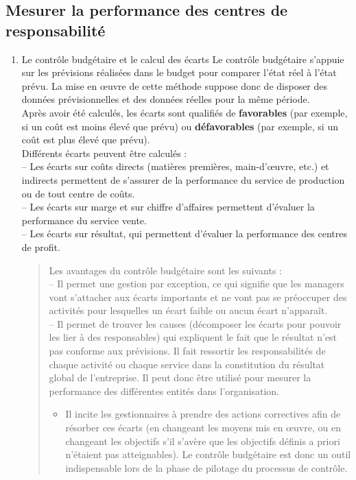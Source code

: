 \documentclass{tufte-handout}
\begin{document}
\subsection{Mesurer la performance des centres de responsabilité}
\label{sec:org667f573}
\begin{enumerate}
\item Le contrôle budgétaire et le calcul des écarts
\label{sec:orge544640}
Le contrôle budgétaire s’appuie sur les prévisions réalisées dans le budget pour comparer l’état réel à l’état prévu. La mise en œuvre de cette méthode suppose donc de disposer des données prévisionnelles et des données réelles pour la même période.\\
Après avoir été calculés, les écarts sont qualifiés de \textbf{favorables} (par exemple, si un coût est moins élevé que prévu) ou \textbf{défavorables} (par exemple, si un coût est plus élevé que prévu).\\

Différents écarts peuvent être calculés :\\
– Les écarts sur coûts directs (matières premières, main-d’œuvre, etc.) et indirects permettent de s’assurer de la performance du service de production ou de tout centre de coûts.\\
– Les écarts sur marge et sur chiffre d’affaires permettent d’évaluer la performance du service vente.\\
– Les écarts sur résultat, qui permettent d’évaluer la performance des centres de profit.\\

\begin{quote}
Les avantages du contrôle budgétaire sont les suivants :\\
– Il permet une gestion par exception, ce qui signifie que les managers vont s’attacher aux écarts importants et ne vont pas se préoccuper des activités pour lesquelles un écart faible ou aucun écart n’apparaît.\\
– Il permet de trouver les causes (décomposer les écarts pour pouvoir les lier à des responsables) qui expliquent le fait que le résultat n'est pas conforme aux prévisions. Il fait ressortir les responsabilités de chaque activité ou chaque service dans la constitution du résultat global de l’entreprise. Il peut donc être utilisé pour mesurer la performance des différentes entités dans l’organisation.\\
\begin{itemize}
\item Il incite les gestionnaires à prendre des actions correctives afin de résorber ces écarts (en changeant les moyens mis en œuvre, ou en changeant les objectifs s’il s’avère que les objectifs définis a priori n’étaient pas atteignables). Le contrôle budgétaire est donc un outil indispensable lors de la phase de pilotage du processus de contrôle.\\
\end{itemize}
\end{quote}


\end{enumerate}
\end{document}

